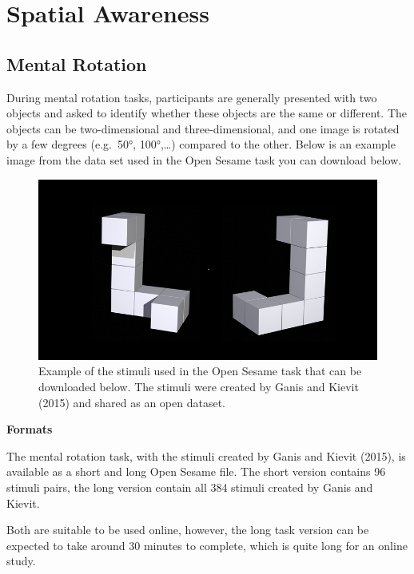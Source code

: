 \documentclass[
]{book}
\begin{document}
\hypertarget{spatial-awareness}{%
\chapter{Spatial Awareness}\label{spatial-awareness}}

\hypertarget{mental-rotation}{%
\section{Mental Rotation}\label{mental-rotation}}

During mental rotation tasks, participants are generally presented with two objects and asked to identify whether these objects are the same or different. The objects can be two-dimensional and three-dimensional, and one image is rotated by a few degrees (e.g.~50°, 100°,\ldots) compared to the other. Below is an example image from the data set used in the Open Sesame task you can download below.

\begin{figure}

{\centering \includegraphics[width=0.75\linewidth]{images/RotationExample} 

}

\caption{Example of the stimuli used in the Open Sesame task that can be downloaded below. The stimuli were created by Ganis and Kievit (2015) and shared as an open dataset.}\label{fig:Figure5-1}
\end{figure}

\textbf{Formats}

The mental rotation task, with the stimuli created by Ganis and Kievit (2015), is available as a short and long Open Sesame file. The short version contains 96 stimuli pairs, the long version contain all 384 stimuli created by Ganis and Kievit.

Both are suitable to be used online, however, the long task version can be expected to take around 30 minutes to complete, which is quite long for an online
study.
\end{document}
